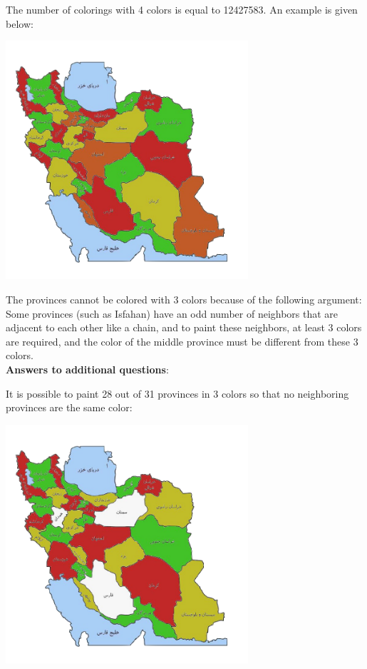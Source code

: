 \begin{solution}
The number of colorings with 4 colors is equal to 12427583. An example is given below:

\begin{center}
	\includegraphics[width=9cm]{43/figs/43_sol1.png}
\end{center}

The provinces cannot be colored with 3 colors because of the following argument: Some provinces (such as Isfahan) have an odd number of neighbors that are adjacent to each other like a chain, and to paint these neighbors, at least 3 colors are required, and the color of the middle province must be different from these 3 colors.\\[0.2cm]

\textbf{Answers to additional questions}:

It is possible to paint 28 out of 31 provinces in 3 colors so that no neighboring provinces are the same color:

\begin{center}
	\includegraphics[width=9cm]{43/figs/43_sol2.png}
\end{center}


\end{solution}
